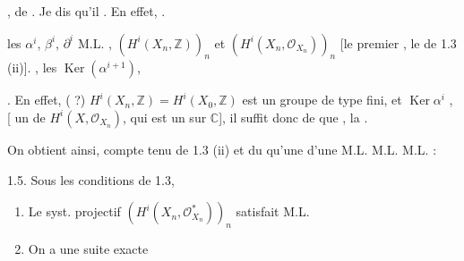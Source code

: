 \documentclass[11pt,a4paper]{article}
\begin{document}

 \ill{} \ill{} , \ill{}  \ill{}  \struck{\ill{} \ill{}}  de . Je dis qu'il   \struck{\ill{} \ill{}}  . En effet, \ill{} \ill{} \ill{} \ill{} \ill{}.

  \ill{} les  \ill{}  $\alpha^i$, $\beta^i$, $\partial^i$  \ill{}  M.L.  \ill{}, \ill{} \ill{} \ill{} \ill{} \ill{}    $(H^i(X_n, \mathbb{Z}))_n$ et $(H^i(X_n, \mathcal{O}_{X_n}))_n$  [le premier  , le   de 1.3 (ii)].   \ill{}, \ill{} \ill{}  \ill{} \ill{} \ill{}  les $\operatorname{Ker}(\alpha^{i+1})$, \ill{} \ill{} \ill{} \ill{}  \struck{\ill{}}    \ill{}

. En effet, (\ill{} ?) $H^i(X_n, \mathbb{Z}) = H^i(X_0, \mathbb{Z})$ est un groupe de type fini, et  \ill{}  $\operatorname{Ker} \alpha^i$  \ill{},  [ \ill{} \ill{} un  de $H^i(X, \mathcal{O}_{X_n})$, qui est un  sur $\mathbb{C}$], \struck{\ill{}} il suffit donc de  que \ill{} \ill{} \ill{} \ill{}, la  \ill{}  \ill{} \ill{} .

On obtient ainsi, compte tenu de 1.3 (ii) et du  qu'une  \ill{} d'une  M.L.   M.L.  M.L. :

\emph{ } 1.5. Sous les conditions de 1.3,
\begin{enumerate}
  \item[(i)] Le syst. projectif $(H^i(X_n, \mathcal{O}^*_{X_n}))_n$ satisfait M.L.
  \item[(ii)] On a une suite exacte
\end{enumerate}
\end{document}

